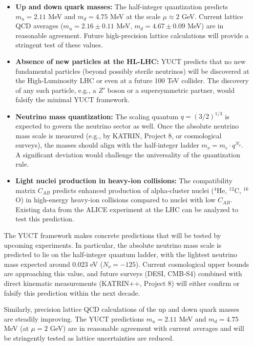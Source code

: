\documentclass[11pt,a4paper]{article}
\begin{document}
	\begin{itemize}
		\item \textbf{Up and down quark masses:} The half-integer quantization predicts $m_u = 2.11$ MeV and $m_d = 4.75$ MeV at the scale $\mu \approx 2$ GeV. Current lattice QCD averages \cite{PDG2024} ($m_u = 2.16 \pm 0.11$ MeV, $m_d = 4.67 \pm 0.09$ MeV) are in reasonable agreement. Future high-precision lattice calculations will provide a stringent test of these values.
		
		\item \textbf{Absence of new particles at the HL-LHC:} YUCT predicts that no new fundamental particles (beyond possibly sterile neutrinos) will be discovered at the High-Luminosity LHC or even at a future 100 TeV collider. The discovery of any such particle, e.g., a $Z'$ boson or a supersymmetric partner, would falsify the minimal YUCT framework.
		
		\item \textbf{Neutrino mass quantization:} The scaling quantum $q = (3/2)^{1/3}$ is expected to govern the neutrino sector as well. Once the absolute neutrino mass scale is measured (e.g., by KATRIN, Project 8, or cosmological surveys), the masses should align with the half-integer ladder $m_\nu = m_e \cdot q^{N_\nu}$. A significant deviation would challenge the universality of the quantization rule.
		
		\item \textbf{Light nuclei production in heavy-ion collisions:} The compatibility matrix $C_{AB}$ predicts enhanced production of alpha-cluster nuclei ($^4$He, $^{12}$C, $^{16}$O) in high-energy heavy-ion collisions compared to nuclei with low $C_{AB}$. Existing data from the ALICE experiment at the LHC can be analyzed to test this prediction.
	\end{itemize}
	
	The YUCT framework makes concrete predictions that will be tested by upcoming experiments. In particular, the absolute neutrino mass scale is predicted to lie on the half‑integer quantum ladder, with the lightest neutrino mass expected around $0.023$ eV ($N_\nu = -125$). Current cosmological upper bounds are approaching this value, and future surveys (DESI, CMB‑S4) combined with direct kinematic measurements (KATRIN++, Project 8) will either confirm or falsify this prediction within the next decade.
	
	Similarly, precision lattice QCD calculations of the up and down quark masses are steadily improving. The YUCT predictions $m_u = 2.11$ MeV and $m_d = 4.75$ MeV (at $\mu = 2$ GeV) are in reasonable agreement with current averages and will be stringently tested as lattice uncertainties are reduced.
	
\end{document}
